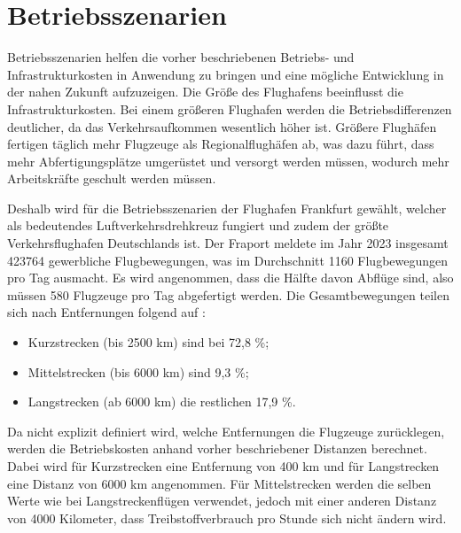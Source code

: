 
\section{Betriebsszenarien}
\label{s:Betriebsszenarien}
Betriebsszenarien helfen die vorher beschriebenen Betriebs- und Infrastrukturkosten 
in Anwendung zu bringen und eine mögliche Entwicklung in der nahen Zukunft aufzuzeigen. 
Die Größe des Flughafens beeinflusst die Infrastrukturkosten. 
Bei einem größeren Flughafen werden die Betriebsdifferenzen deutlicher, da das Verkehrsaufkommen wesentlich höher ist.
Größere Flughäfen fertigen täglich mehr Flugzeuge als Regionalflughäfen ab, 
was dazu führt, dass mehr Abfertigungsplätze umgerüstet und versorgt werden müssen,
wodurch mehr Arbeitskräfte geschult werden müssen.

Deshalb wird für die Betriebsszenarien der Flughafen Frankfurt gewählt,
welcher als bedeutendes Luftverkehrsdrehkreuz fungiert
und zudem der größte Verkehrsflughafen Deutschlands ist.
Der Fraport meldete im Jahr 2023 insgesamt 423764 gewerbliche Flugbewegungen, was im Durchschnitt 1160 Flugbewegungen pro Tag ausmacht. 
Es wird angenommen, dass die Hälfte davon Abflüge sind, also müssen 580 Flugzeuge pro Tag abgefertigt werden.
%
Die Gesamtbewegungen teilen sich nach Entfernungen folgend auf \cite{fraport2023frankfurt}:
\begin{itemize}
    \item Kurzstrecken (bis 2500 km) sind bei 72,8 \%;
    \item Mittelstrecken (bis 6000 km) sind 9,3 \%;
    \item Langstrecken (ab 6000 km) die restlichen 17,9 \%. 
    \end{itemize}
Da nicht explizit definiert wird, welche Entfernungen die Flugzeuge zurücklegen, werden die Betriebskosten anhand vorher beschriebener Distanzen berechnet.
Dabei wird für Kurzstrecken eine Entfernung von 400 km und für Langstrecken eine Distanz von 6000 km angenommen.
Für Mittelstrecken werden die selben Werte wie bei Langstreckenflügen verwendet, jedoch mit einer anderen Distanz von 4000 Kilometer,
dass Treibstoffverbrauch pro Stunde sich nicht ändern wird.

